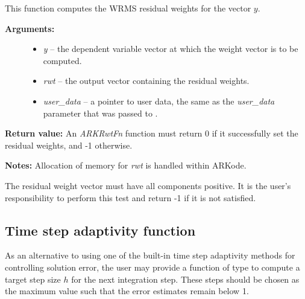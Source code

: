 \documentclass[letterpaper,10pt,english]{sphinxmanual}
\begin{document}
\begin{fulllineitems}
\label{c_interface/User_supplied:ARKRwtFn}
This function computes the WRMS residual weights for the vector
$y$.
\begin{description}
\item[{\textbf{Arguments:}}] \leavevmode\begin{itemize}
\item {} 
\emph{y} -- the dependent variable vector at which the
weight vector is to be computed.

\item {} 
\emph{rwt} -- the output vector containing the residual weights.

\item {} 
\emph{user\_data} -- a pointer to user data, the same as the
\emph{user\_data} parameter that was passed to {\hyperref[c_interface/User_callable:ARKodeSetUserData]{}}.

\end{itemize}

\end{description}

\textbf{Return value:}
An \emph{ARKRwtFn} function must return 0 if it
successfully set the residual weights, and -1 otherwise.

\textbf{Notes:} Allocation of memory for \emph{rwt} is handled within ARKode.

The residual weight vector must have all components positive.  It is
the user's responsibility to perform this test and return -1 if it
is not satisfied.

\end{fulllineitems}



\subsection{Time step adaptivity function}
\label{c_interface/User_supplied:time-step-adaptivity-function}\label{c_interface/User_supplied:cinterface-adaptivityfn}
As an alternative to using one of the built-in time step adaptivity
methods for controlling solution error, the user may provide a
function of type {\hyperref[c_interface/User_supplied:ARKAdaptFn]{}} to compute a target step size
$h$ for the next integration step.  These steps should be chosen
as the maximum value such that the error estimates remain below 1.
\end{document}
